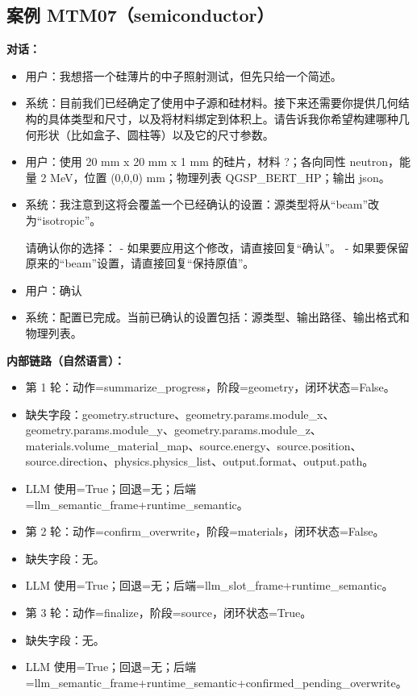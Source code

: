 \documentclass[11pt]{ctexart}
\begin{document}
\subsection{案例 MTM07（semiconductor）}
\textbf{对话：}
\begin{itemize}
\item 用户：我想搭一个硅薄片的中子照射测试，但先只给一个简述。
\item 系统：目前我们已经确定了使用中子源和硅材料。接下来还需要你提供几何结构的具体类型和尺寸，以及将材料绑定到体积上。请告诉我你希望构建哪种几何形状（比如盒子、圆柱等）以及它的尺寸参数。
\item 用户：使用 20 mm x 20 mm x 1 mm 的硅片，材料 ?；各向同性 neutron，能量 2 MeV，位置 (0,0,0) mm；物理列表 QGSP\_BERT\_HP；输出 json。
\item 系统：我注意到这将会覆盖一个已经确认的设置：源类型将从“beam”改为“isotropic”。

请确认你的选择：
- 如果要应用这个修改，请直接回复“确认”。
- 如果要保留原来的“beam”设置，请直接回复“保持原值”。
\item 用户：确认
\item 系统：配置已完成。当前已确认的设置包括：源类型、输出路径、输出格式和物理列表。
\end{itemize}
\textbf{内部链路（自然语言）：}
\begin{itemize}
\item 第 1 轮：动作=summarize\_progress，阶段=geometry，闭环状态=False。
\item 缺失字段：geometry.structure、geometry.params.module\_x、geometry.params.module\_y、geometry.params.module\_z、materials.volume\_material\_map、source.energy、source.position、source.direction、physics.physics\_list、output.format、output.path。
\item LLM 使用=True；回退=无；后端=llm\_semantic\_frame+runtime\_semantic。
\item 第 2 轮：动作=confirm\_overwrite，阶段=materials，闭环状态=False。
\item 缺失字段：无。
\item LLM 使用=True；回退=无；后端=llm\_slot\_frame+runtime\_semantic。
\item 第 3 轮：动作=finalize，阶段=source，闭环状态=True。
\item 缺失字段：无。
\item LLM 使用=True；回退=无；后端=llm\_semantic\_frame+runtime\_semantic+confirmed\_pending\_overwrite。
\end{itemize}
\end{document}
